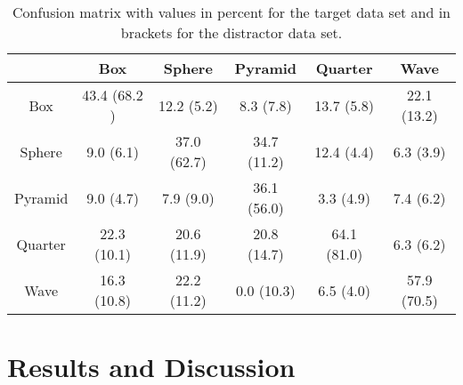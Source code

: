\begin{table}[H]
	\centering
	\begin{tabular}{|c||c|c|c|c|c|}
		\hline
		 & Box & Sphere & Pyramid & Quarter & Wave \\
		\hline\hline
		Box     & 43.4 (68.2 )& 12.2 (5.2)   & 8.3 (7.8)   & 13.7 (5.8)   & 22.1 (13.2) \\
		Sphere  & 9.0 (6.1)     & 37.0 (62.7)    & 34.7 (11.2) & 12.4 (4.4)   & 6.3 (3.9)\\
		Pyramid & 9.0 (4.7)     & 7.9  (9.0)     & 36.1 (56.0) & 3.3 (4.9)    & 7.4 (6.2)\\
		Quarter & 22.3 (10.1) & 20.6 (11.9)  & 20.8 (14.7) & 64.1 (81.0)  & 6.3 (6.2)\\
		Wave    & 16.3 (10.8) & 22.2 (11.2)  & 0.0 (10.3)    & 6.5 (4.0)    & 57.9 (70.5)\\
		\hline
	\end{tabular}
	\caption{Confusion matrix with values in percent for the target data set and in brackets for the distractor data set.}
	\label{Confusion}
\end{table} 
\section{Results and Discussion} \label{results}
